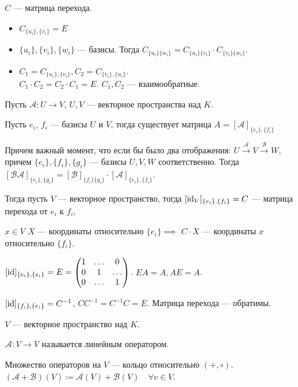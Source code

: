 $C$ --- матрица перехода.
 \begin{remark}
\begin{itemize}
    \item $C_{\{u_i\}, \{v_i\}} = E$
    \item $\{u_i\}, \{v_i\}, \{w_i\}$ --- базисы. Тогда $C_{\{u_i\}\{w_i\}} = C_{\{u_i\}\{v_i\}} \cdot C_{\{v_i\}\{w_i\}}$.
    \item  $C_1 = C_{\{u_i\}, \{v_i\}}, C_2 = C_{\{v_i\}, \{u_i\}}$. \\
        $C_1 \cdot C_2 = C_2 \cdot C_1 = E$. $C_1, C_2$ --- взаимообратные.
\end{itemize}
\end{remark}

Пусть $\mathcal{A}\!: U \to V$,  $U, V$ --- векторное пространства над  $K$. 

Пусть  $e_i$,  $f_i$ --- базисы $U$ и  $V$, тогда существует матрица  $A = [\mathcal{A}]_{\{e_i\}, \{f_i\}}$

Причем важный момент, что если бы было два отображения:  $U \xrightarrow{\mathcal{A}} V \xrightarrow{\mathcal{B}} W$, причем  $\{e_i\}, \{f_i\}, \{g_i\}$ --- базисы  $U, V, W$ соответственно.  Тогда  $[\mathcal{B}\mathcal{A}]_{\{e_i\}, \{g_i\}} = [\mathcal{B}]_{\{f_i\} \{g_i\} } \cdot [\mathcal{A}]_{\{e_i\}, \{f_i\}}$.

Тогда пусть $V$ --- векторное пространство, тогда  $[\operatorname{id}_V]_{\{e_i\}, \{f_i\}} = C$ --- матрица перехода от $e_i$ к  $f_i$,

$x \in V$  $X$ --- координаты относительно  $\{e_i\} \implies $  $C \cdot X$ --- координаты  $x$ относительно   $\{f_i\}$.

$[\operatorname{id}]_{\{e_i\}, \{e_i\}} = E = \begin{pmatrix} 1 & \ldots & 0 \\ 0 & 1 & \ldots \\ 0 & \ldots & 1 \end{pmatrix}$. $EA = A, AE = A$.

$[\operatorname{id}]_{\{f_i\}, \{e_i\}} = C^{-1}$,  $CC^{-1} = C^{-1}C = E$. Матрица перехода --- обратимы. 

\begin{definition}
    $V$ --- векторное пространство над  $K$.

    $\mathcal{A}\!: V \to V$ называется линейным оператором.
\end{definition}

Множество операторов на $V$ --- кольцо относительно  $(+, \circ)$.  $(\mathcal{A} + \mathcal{B})(V) \coloneqq \mathcal{A}(V) + \mathcal{B}(V) \quad \forall v \in V$.


